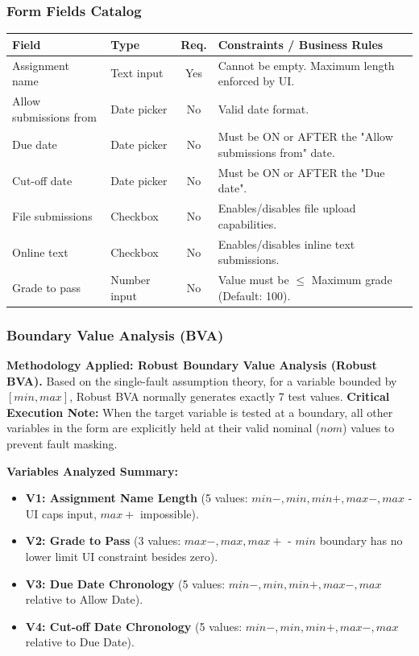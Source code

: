 \documentclass[twoside,final]{hcmut-report}
\begin{document}
\subsubsection{Form Fields Catalog}
\begin{table}[H]
\centering
\renewcommand{\arraystretch}{1.3}
\begin{tabularx}{\textwidth}{|l|l|c|X|}
\hline
\textbf{Field} & \textbf{Type} & \textbf{Req.} & \textbf{Constraints / Business Rules} \\ \hline
Assignment name & Text input & Yes & Cannot be empty. Maximum length enforced by UI. \\ \hline
Allow submissions from & Date picker & No & Valid date format. \\ \hline
Due date & Date picker & No & Must be ON or AFTER the "Allow submissions from" date. \\ \hline
Cut-off date & Date picker & No & Must be ON or AFTER the "Due date". \\ \hline
File submissions & Checkbox & No & Enables/disables file upload capabilities. \\ \hline
Online text & Checkbox & No & Enables/disables inline text submissions. \\ \hline
Grade to pass & Number input & No & Value must be $\le$ Maximum grade (Default: 100). \\ \hline
\end{tabularx}
\end{table}

\subsubsection{Boundary Value Analysis (BVA)}
\textbf{Methodology Applied: Robust Boundary Value Analysis (Robust BVA).} 
Based on the single-fault assumption theory, for a variable bounded by $[min, max]$, Robust BVA normally generates exactly 7 test values. \textbf{Critical Execution Note:} When the target variable is tested at a boundary, all other variables in the form are explicitly held at their valid nominal ($nom$) values to prevent fault masking.

\textbf{Variables Analyzed Summary:}
\begin{itemize}
    \item \textbf{V1: Assignment Name Length} (5 values: $min-, min, min+, max-, max$ - UI caps input, $max+$ impossible).
    \item \textbf{V2: Grade to Pass} (3 values: $max-, max, max+$ - $min$ boundary has no lower limit UI constraint besides zero).
    \item \textbf{V3: Due Date Chronology} (5 values: $min-, min, min+, max-, max$ relative to Allow Date).
    \item \textbf{V4: Cut-off Date Chronology} (5 values: $min-, min, min+, max-, max$ relative to Due Date).
\end{itemize}
\end{document}
